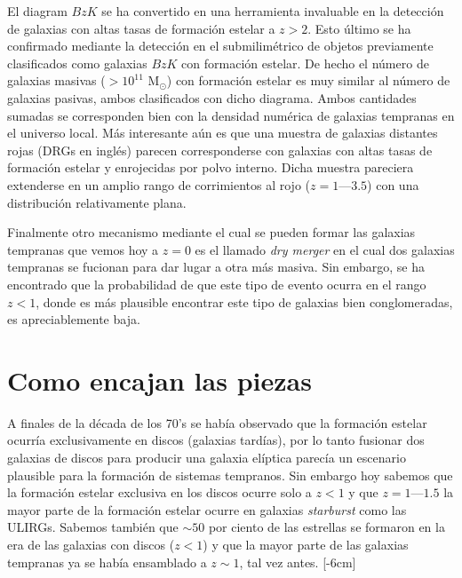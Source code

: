 \documentclass[a4paper,twoside]{article}
\begin{document}
El diagram $BzK$ se ha convertido en una herramienta invaluable en la detección de galaxias con altas tasas de formación estelar a $z>2$. Esto último se ha confirmado mediante la detección en el submilimétrico de objetos previamente clasificados como galaxias $BzK$ con formación estelar. De hecho el número de galaxias masivas ($>10^{11}$ M${}_\odot$) con formación estelar es muy similar al número de galaxias pasivas, ambos clasificados con dicho diagrama. Ambos cantidades sumadas se corresponden bien con la densidad numérica de galaxias tempranas en el universo local. Más interesante aún es que una muestra de galaxias distantes rojas (DRGs en inglés) parecen corresponderse con galaxias con altas tasas de formación estelar y enrojecidas por polvo interno. Dicha muestra pareciera extenderse en un amplio rango de corrimientos al rojo ($z=1$---$3.5$) con una distribución relativamente plana.

Finalmente otro mecanismo mediante el cual se pueden formar las galaxias tempranas que vemos hoy a $z=0$ es el llamado \emph{dry merger} en el cual dos galaxias tempranas se fucionan para dar lugar a otra más masiva. Sin embargo, se ha encontrado que la probabilidad de que este tipo de evento ocurra en el rango $z<1$, donde es más plausible encontrar este tipo de galaxias bien conglomeradas, es apreciablemente baja.

\section{Como encajan las piezas}

A finales de la década de los 70's se había observado que la formación estelar ocurría exclusivamente en discos (galaxias tardías), por lo tanto fusionar dos galaxias de discos para producir una galaxia elíptica parecía un escenario plausible para la formación de sistemas tempranos. Sin embargo hoy sabemos que la formación estelar exclusiva en los discos ocurre solo a $z<1$ y que $z=1$---$1.5$ la mayor parte de la formación estelar ocurre en galaxias \emph{starburst} como las ULIRGs. Sabemos también que $\sim50$ por ciento de las estrellas se formaron en la era de las galaxias con discos ($z<1$) y que la mayor parte de las galaxias tempranas ya se había ensamblado a $z\sim1$, tal vez antes. [-6cm]
\end{document}
